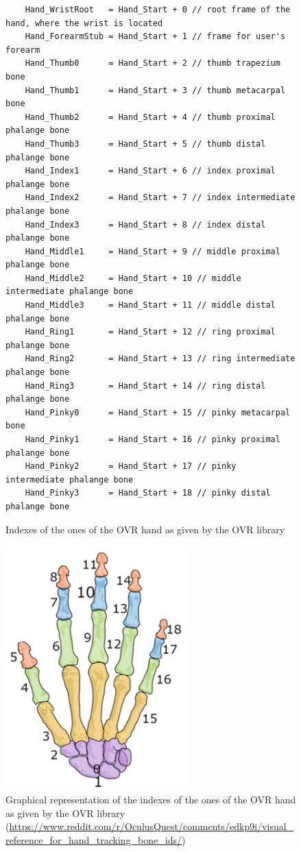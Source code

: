 \documentclass{article}
\begin{document}
\begin{figure}[h]
	\centering
	\begin{verbatim}
	Hand_WristRoot   = Hand_Start + 0 // root frame of the hand, where the wrist is located
	Hand_ForearmStub = Hand_Start + 1 // frame for user's forearm
	Hand_Thumb0      = Hand_Start + 2 // thumb trapezium bone
	Hand_Thumb1      = Hand_Start + 3 // thumb metacarpal bone
	Hand_Thumb2      = Hand_Start + 4 // thumb proximal phalange bone
	Hand_Thumb3      = Hand_Start + 5 // thumb distal phalange bone
	Hand_Index1      = Hand_Start + 6 // index proximal phalange bone
	Hand_Index2      = Hand_Start + 7 // index intermediate phalange bone
	Hand_Index3      = Hand_Start + 8 // index distal phalange bone
	Hand_Middle1     = Hand_Start + 9 // middle proximal phalange bone
	Hand_Middle2     = Hand_Start + 10 // middle intermediate phalange bone
	Hand_Middle3     = Hand_Start + 11 // middle distal phalange bone
	Hand_Ring1       = Hand_Start + 12 // ring proximal phalange bone
	Hand_Ring2       = Hand_Start + 13 // ring intermediate phalange bone
	Hand_Ring3       = Hand_Start + 14 // ring distal phalange bone
	Hand_Pinky0      = Hand_Start + 15 // pinky metacarpal bone
	Hand_Pinky1      = Hand_Start + 16 // pinky proximal phalange bone
	Hand_Pinky2      = Hand_Start + 17 // pinky intermediate phalange bone
	Hand_Pinky3      = Hand_Start + 18 // pinky distal phalange bone
	\end{verbatim}
	\caption{Indexes of the ones of the OVR hand as given by the OVR library}
	\label{fig:ovrHandIndexesTab}
\end{figure}

\begin{figure}[H]
	\centering
	\includegraphics[width=7cm]{images/ovrHandBonesIndexes.png}
	\caption{Graphical representation of the indexes of the ones of the OVR hand as given by the OVR library (\url{https://www.reddit.com/r/OculusQuest/comments/edkp9i/visual_reference_for_hand_tracking_bone_ids/})}
	\label{fig:ovrHandIndexes}
\end{figure}
\end{document}
